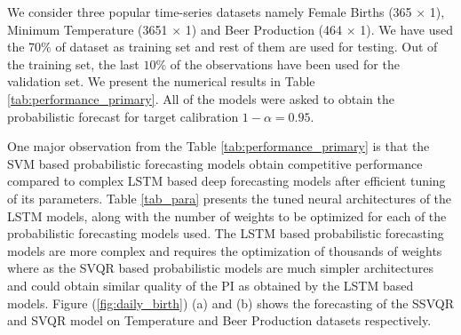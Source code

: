 \documentclass[10pt]{article} %
\begin{document}
We consider three popular time-series datasets namely Female Births (365 $\times$ 1), Minimum Temperature (3651 $\times$ 1)  and Beer Production (464 $\times$ 1). We have used the 70$\%$ of dataset as training set and rest of them are used for testing. Out of the training set, the last $10\%$ of the observations have been used for the validation set. We present the numerical results in Table \ref{tab:performance_primary}.  All of the models were asked to obtain the probabilistic  forecast for target calibration $1-\alpha = 0.95$. 

One major observation from the Table \ref{tab:performance_primary} is that the SVM based probabilistic forecasting models obtain competitive performance compared to complex LSTM based deep forecasting models after efficient tuning of its parameters. Table \ref{tab_para} presents the tuned neural architectures of the LSTM models, along with the number of weights to be optimized for each of the probabilistic forecasting models used.
The LSTM based probabilistic forecasting models are more complex and requires the optimization of thousands of weights where as the SVQR based probabilistic models are much simpler architectures and could obtain similar quality of the PI as obtained by the LSTM based models.  Figure (\ref{fig:daily_birth}) (a) and (b) shows the forecasting of the SSVQR and SVQR model on Temperature and Beer Production datasets respectively.
\end{document}

